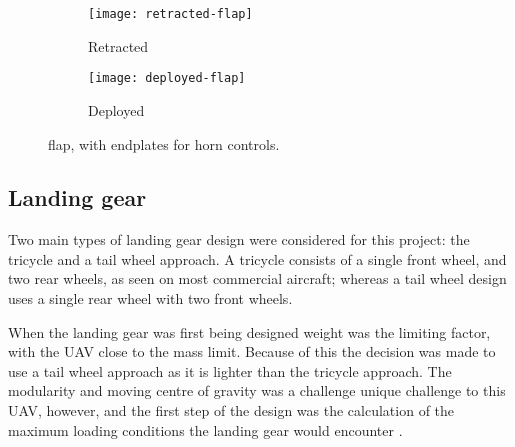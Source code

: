 \documentclass[../../main.tex]{subfiles}
\begin{document}
\begin{figure}[H]

    \centering
    \begin{subfigure}[b]{0.49\columnwidth}
        \centering
        \texttt{[image: retracted-flap]}
        \caption{Retracted}
        \label{fig:flaps:retracted}
    \end{subfigure}
    \hfill
    \begin{subfigure}[b]{0.49\columnwidth}
        \centering
        \texttt{[image: deployed-flap]}
        \caption{Deployed}
        \label{fig:flaps:deployed}
    \end{subfigure}
    
    \caption{flap, with endplates for horn controls.}
    \label{fig:flaps}
\end{figure}

\subsection{Landing gear} \label{sec:design-process:design-revision:landing-gear}

Two main types of landing gear design were considered for this project: the tricycle and a tail wheel approach.
A tricycle consists of a single front wheel, and two rear wheels, as seen on most commercial aircraft; whereas a tail wheel design uses a single rear wheel with two front wheels.


When the landing gear was first being designed weight was the limiting factor, with the UAV close to the  mass limit.
Because of this the decision was made to use a tail wheel approach as it is lighter than the tricycle approach.
The modularity and moving centre of gravity was a challenge unique challenge to this UAV, however, and the first step of the design was the calculation of the maximum loading conditions the landing gear would encounter \cite{goud-14}. 
\end{document}
